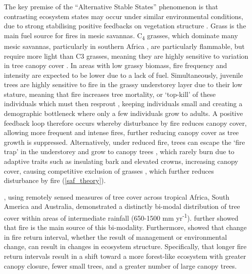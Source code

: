 \begin{refsection}
The key premise of the ``Alternative Stable States'' phenomenon is that contrasting ecosystem states may occur under similar environmental conditions, due to strong stabilising positive feedbacks on vegetation structure \citep{Staver2011}. Grass is the main fuel source for fires in mesic savannas. C\textsubscript{4} grasses, which dominate many mesic savannas, particularly in southern Africa \citep{Still2003}, are particularly flammable, but require more light than C3 grasses, meaning they are highly sensitive to variation in tree canopy cover \citep{CharlesDominique2018}. In areas with low grassy biomass, fire frequency and intensity are expected to be lower due to a lack of fuel. Simultaneously, juvenile trees are highly sensitive to fire in the grassy understorey layer due to their low stature, meaning that fire increases tree mortality, or `top-kill' of these individuals which must then resprout \citep{Ryan2011}, keeping individuals small and creating a demographic bottleneck where only a few individuals grow to adults. A positive feedback loop therefore occurs whereby disturbance by fire reduces canopy cover, allowing more frequent and intense fires, further reducing canopy cover as tree growth is suppressed. Alternatively, under reduced fire, trees can escape the `fire trap' in the understorey and grow to canopy trees \citep{Wakeling2011}, which rarely burn due to adaptive traits such as insulating bark and elevated crowns, increasing canopy cover, causing competitive exclusion of grasses \citep{Moustakas2013}, which further reduces disturbance by fire (\autoref{saf_theory}). 

\citet{Hirota2011}, using remotely sensed measures of tree cover across tropical Africa, South America and Australia, demonstrated a distinctly bi-modal distribution of tree cover within areas of intermediate rainfall (\textapprox{}650-1500 mm yr\textsuperscript{-1}). \citet{Staver2011} further showed that fire is the main source of this bi-modality. Furthermore, \citet{Staver2017} showed that change in fire return interval, whether the result of management or environmental change, can result in changes in ecosystem structure. Specifically, that longer fire return intervals result in a shift toward a more forest-like ecosystem with greater canopy closure, fewer small trees, and a greater number of large canopy trees.


\end{refsection}
